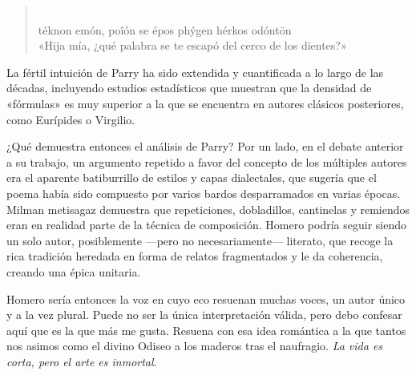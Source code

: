 \begin{verse}
\\
téknon emón, poîón se épos phýgen hérkos odóntōn\\
«Hija mía, ¿qué palabra se te escapó del cerco de los dientes?»
\end{verse}

La fértil intuición de Parry ha sido extendida y cuantificada a lo largo de las décadas, incluyendo estudios estadísticos que muestran que la densidad de «fórmulas» es muy superior a la que se encuentra en autores clásicos posteriores, como Eurípides o Virgilio.

¿Qué demuestra entonces el análisis de Parry? Por un lado, en el debate anterior a su trabajo, un argumento repetido a favor del concepto de los múltiples autores era el aparente batiburrillo de estilos y capas dialectales, que sugería que el poema había sido compuesto por varios bardos desparramados en varias épocas. Milman metisagaz demuestra que repeticiones, dobladillos, cantinelas y remiendos eran en realidad parte de la técnica de composición. Homero podría seguir siendo un solo autor, posiblemente ---pero no necesariamente--- literato, que recoge la rica tradición heredada en forma de relatos fragmentados y le da coherencia, creando una épica unitaria.

Homero sería entonces la voz en cuyo eco resuenan muchas voces, un autor único y a la vez plural. Puede no ser la única interpretación válida, pero debo confesar aquí que es la que más me gusta. Resuena con esa idea romántica a la que tantos nos asimos como el divino Odiseo a los maderos tras el naufragio. \emph{La vida es corta, pero el arte es inmortal}.

